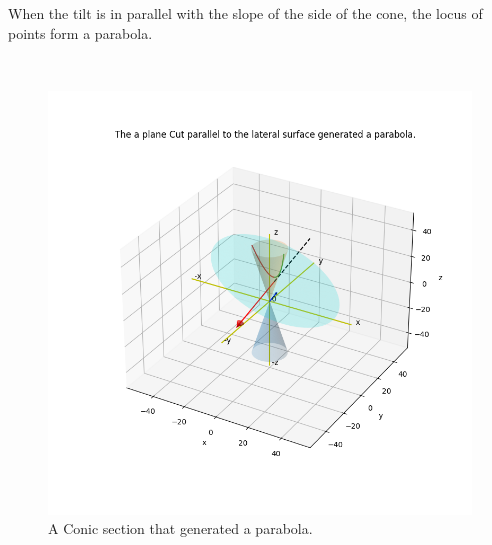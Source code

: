 \documentclass[10pt,a4paper,leqno]{article}
\begin{document}
\begin{CJK*}{UTF8}{gbsn}
\noindent When the tilt is in parallel with the slope of the side of the cone, the    locus of points form a parabola.
 \par \ \par\begin{figure}[H]
\centering\includegraphics[width=1\linewidth,height=0.7\textheight]{Data/fgr05.png}
\caption{A Conic section that generated a parabola. }
\label{fig:Data/fgr05.png}
\end{figure}


\end{CJK*}
\end{document}
